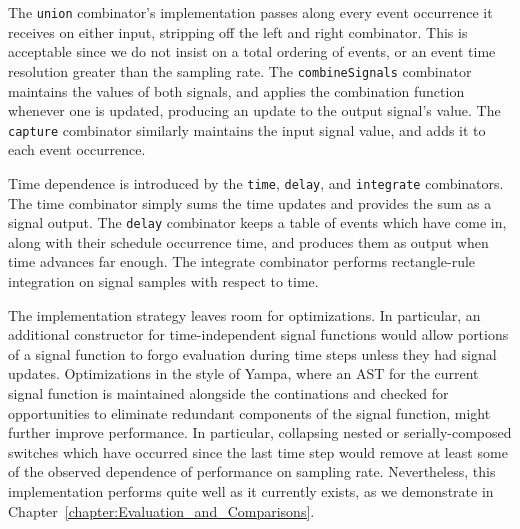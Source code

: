 The {\tt union} combinator's implementation passes along every event occurrence 
it receives on either input, stripping off the left and right combinator. This is 
acceptable since we do not insist on a total ordering of events, or an event time
resolution greater than the sampling rate. The {\tt combineSignals} combinator 
maintains the values of both signals, and applies the combination function whenever
one is updated, producing an update to the output signal's value.
The {\tt capture} combinator similarly maintains the input signal value, and adds it
to each event occurrence.

Time dependence is introduced by the {\tt time}, {\tt delay}, and {\tt integrate}
combinators. The time combinator simply sums the time updates and provides the
sum as a signal output. The {\tt delay} combinator keeps a table of events
which have come in, along with their schedule occurrence time, and produces
them as output when time advances far enough. The integrate combinator performs
rectangle-rule integration on signal samples with respect to time.

The implementation strategy leaves room for optimizations. In particular, an
additional constructor for time-independent signal functions would allow
portions of a signal function to forgo evaluation during time steps unless they
had signal updates. Optimizations in the style of Yampa, where an AST for the
current signal function is maintained alongside the continations and checked for
opportunities to eliminate redundant components of the signal function,
might further improve performance. In particular, collapsing nested or
serially-composed switches which have occurred since the last time step would
remove at least some of the observed dependence of performance on sampling rate.
Nevertheless, this implementation performs quite well as it currently exists, as
we demonstrate in Chapter~\ref{chapter:Evaluation_and_Comparisons}.
